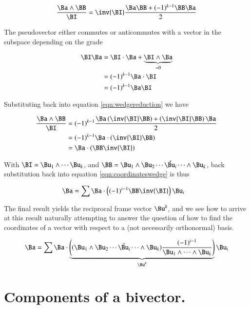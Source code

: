 \documentclass{article}      %
\begin{document}
\begin{equation}\label{eqn:wedgereduction}
\frac{\Ba \wedge \BB}{\BI} = \inv{\BI} \frac{\Ba\BB + (-1)^{k-1}\BB\Ba}{2}
\end{equation}

The pseudovector either commutes or anticommutes with a vector in the subspace depending on the grade

\begin{align*}
\BI \Ba 
&= \BI \cdot \Ba + \underbrace{\BI \wedge \Ba}_{=0} \\
&= (-1)^{k-1}\Ba \cdot \BI \\
&= (-1)^{k-1}\Ba \BI \\
\end{align*}

Substituting back into equation \ref{eqn:wedgereduction} we have

\begin{align*}
\frac{\Ba \wedge \BB}{\BI}
&= (-1)^{k-1} \frac{\Ba \left(\inv{\BI}\BB\right) + \left(\inv{\BI}\BB\right)\Ba}{2} \\
&= (-1)^{k-1} \Ba \cdot \left(\inv{\BI}\BB\right) \\
&= \Ba \cdot \left(\BB \inv{\BI}\right) \\
\end{align*}

With $\BI = \Bu_1 \wedge \cdots \Bu_k$, and $\BB = \Bu_1 \wedge \Bu_2 \cdots \check{\Bu_i} \cdots \wedge \Bu_k$,
back substitution back into equation \ref{eqn:coordinateswedge} is thus

\begin{align*}
\Ba 
&= \sum
\Ba \cdot \left(
(-1)^{i-1} 
\BB \inv{\BI}\right) \Bu_i
\end{align*}

The final result yields the reciprocal frame vector $\Bu^k$, and we see how to arrive at this result naturally attempting
to answer the question of how to find the coordinates of a vector with respect to a (not necessarily orthonormal) basis.

\begin{equation}\label{eqn:recipdot}
\Ba =
\sum
\Ba \cdot 
\underbrace{
\left((\Bu_1 \wedge \Bu_2 \cdots \check{\Bu_i} \cdots \wedge \Bu_k) \frac{ (-1)^{i-1} }{ \Bu_1 \wedge \cdots \wedge \Bu_k }\right) 
}_{\Bu^k}
\Bu_i
\end{equation}

\section{ Components of a bivector. }
\end{document}

